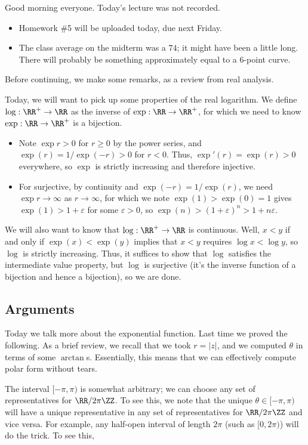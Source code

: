 
Good morning everyone. Today's lecture was not recorded.
\begin{itemize}
	\item Homework \#5 will be uploaded today, due next Friday.
	\item The class average on the midterm was a $74$; it might have been a little long. There will probably be something approximately equal to a $6$-point curve.
\end{itemize}
Before continuing, we make some remarks, as a review from real analysis.
\begin{remark}[Nir]
	Today, we will want to pick up some properties of the real logarithm. We define $\log:\RR^+\to\RR$ as the inverse of $\exp:\RR\to\RR^+$, for which we need to know $\exp:\RR\to\RR^+$ is a bijection.
	\begin{itemize}
		\item Note $\exp r>0$ for $r\ge0$ by the power series, and $\exp(r)=1/\exp(-r)>0$ for $r<0$. Thus, $\exp'(r)=\exp(r)>0$ everywhere, so $\exp$ is strictly increasing and therefore injective.
		\item For surjective, by continuity and $\exp(-r)=1/\exp(r)$, we need $\exp r\to\infty$ as $r\to\infty$, for which we note $\exp(1)>\exp(0)=1$ gives $\exp(1)>1+\varepsilon$ for some $\varepsilon>0$, so $\exp(n)>(1+\varepsilon)^n>1+n\varepsilon$.
	\end{itemize}
\end{remark}
\begin{remark}[Nir]
	We will also want to know that $\log:\RR^+\to\RR$ is continuous. Well, $x<y$ if and only if $\exp(x)<\exp(y)$ implies that $x<y$ requires $\log x<\log y$, so $\log$ is strictly increasing. Thus, it suffices to show that $\log$ satisfies the intermediate value property, but $\log$ is surjective (it's the inverse function of a bijection and hence a bijection), so we are done.
\end{remark}

\subsection{Arguments}
Today we talk more about the exponential function. Last time we proved the following.
\polarform*
\noindent As a brief review, we recall that we took $r=|z|$, and we computed $\theta$ in terms of some $\arctan$s. Essentially, this means that we can effectively compute polar form without tears.
\begin{remark}
	The interval $[-\pi,\pi)$ is somewhat arbitrary; we can choose any set of representatives for $\RR/2\pi\ZZ$. To see this, we note that the unique $\theta\in[-\pi,\pi)$ will have a unique representative in any set of representatives for $\RR/2\pi\ZZ$ and vice versa. For example, any half-open interval of length $2\pi$ (such as $[0,2\pi)$) will do the trick. To see this, 
\end{remark}

